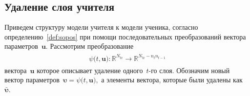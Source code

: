 \documentclass[12pt]{a&t}
\begin{document}
\subsection{Удаление слоя учителя}
Приведем структуру модели учителя к модели ученика, согласно определению~\ref{def:sopos} при помощи последовательных преобразований вектора параметров~$\mathbf{u}$. Рассмотрим преобразование
\begin{gather}
\label{eq:ap:4}
\begin{aligned}
\psi\bigr(t, \mathbf{u}\bigr) : \mathbb{R}^{N_{\text{tr}}} \to \mathbb{R}^{N_{\text{tr}}-n_tn_{t-1}}
\end{aligned}
\end{gather}
вектора~$\mathbf{u}$ которое описывает удаление одного~$t$-го слоя.
Обозначим новый вектор параметров~$\bm{\upsilon} = \psi\bigr(t, \mathbf{u}\bigr),$ а элементы вектора, которые были удалены как~$\bar{\bm{\upsilon}}.$ 
\end{document}
